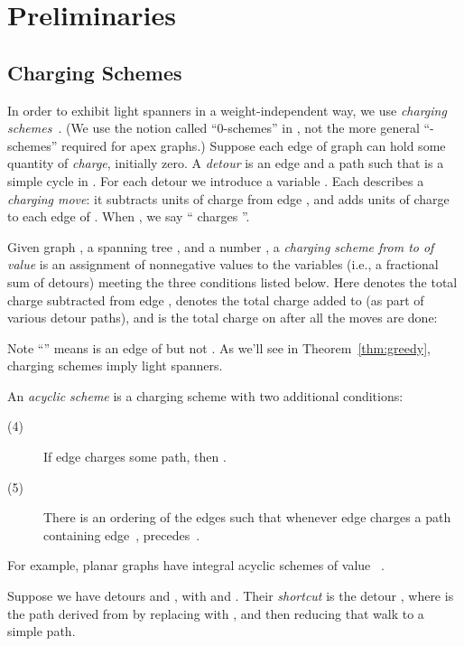 \documentclass{llncs}
\begin{document}
\section{Preliminaries}

\subsection{Charging Schemes}

In order to exhibit light spanners in a weight-independent way, we use
\emph{charging schemes}~\cite{Grigni:2002:LSA:545381.545492}.  (We use
the notion called ``0-schemes'' in
\cite{Grigni:2002:LSA:545381.545492}, not the more general
``-schemes'' required for apex graphs.)  Suppose each edge
of graph  can hold some quantity of \emph{charge}, initially zero.
A \emph{detour} is an edge  and a path  such that  is
a simple cycle in .  For each detour  we introduce a
variable .  Each  describes a
\emph{charging move}: it subtracts  units of charge from
edge , and adds  units of charge to each edge of .
When , we say `` charges ''.


Given graph , a spanning tree , and a number , a
\emph{charging scheme from  to  of value } is an assignment
of nonnegative values to the  variables (i.e., a fractional
sum of detours) meeting the three conditions listed below.  Here 
 denotes the total charge subtracted from edge ,
 denotes the total charge added to  (as part of various detour
paths),
and  is the total charge on  after all
the moves are done:

Note ``'' means  is an edge of  but not .
As we'll see in Theorem~\ref{thm:greedy}, charging schemes imply light
spanners.
\begin{definition} 
An \emph{acyclic scheme} is a charging scheme with two additional
conditions:
\begin{description}
\item[\textnormal{(4)}] If edge  charges some path, then .
\item[\textnormal{(5)}] There is an ordering of the edges such that whenever
edge  charges a path containing edge~,  precedes~.
\end{description}
\end{definition}
For example, planar graphs have integral acyclic
schemes of value ~\cite{Althofer:1993:SSW:156252.156258}.
\begin{definition}
Suppose we have detours  and , with 
and .  Their \emph{shortcut} is the detour ,
where  is the path derived from  by replacing  with
, and then reducing that walk to a simple path.
\end{definition}
\end{document}
